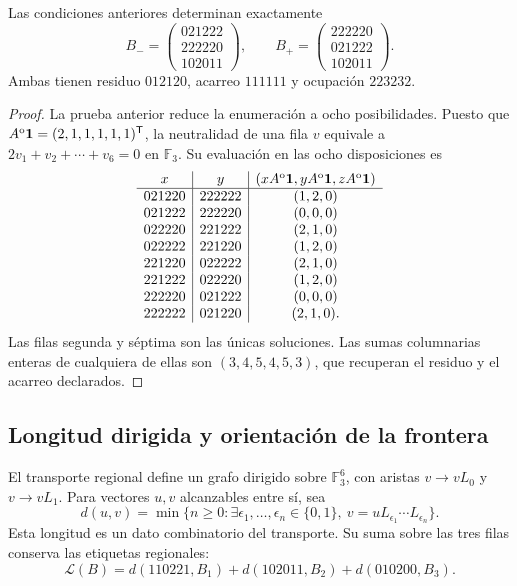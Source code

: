 \begin{theorem}
\label{r36c:thm:dos}
Las condiciones anteriores determinan exactamente
\[
B_- =\begin{pmatrix}021222\\222220\\102011\end{pmatrix},
\qquad
B_+ =\begin{pmatrix}222220\\021222\\102011\end{pmatrix}.
\]
Ambas tienen residuo $012120$, acarreo $111111$ y ocupación $223232$.
\end{theorem}
\begin{proof}
La prueba anterior reduce la enumeración a ocho posibilidades. Puesto que
$A^{\rm o}\mathbf1=(2,1,1,1,1,1)^{\mathsf T}$, la neutralidad de una
fila $v$ equivale a $2v_1+v_2+\cdots+v_6=0$ en $\mathbb F_3$.
Su evaluación en las ocho disposiciones es
\[
\begin{array}{c|c|c}
x&y&(xA^{\rm o}\mathbf1,yA^{\rm o}\mathbf1,zA^{\rm o}\mathbf1)\\\hline
021220&222222&(1,2,0)\\
021222&222220&(0,0,0)\\
022220&221222&(2,1,0)\\
022222&221220&(1,2,0)\\
221220&022222&(2,1,0)\\
221222&022220&(1,2,0)\\
222220&021222&(0,0,0)\\
222222&021220&(2,1,0).
\end{array}
\]
Las filas segunda y séptima son las únicas soluciones. Las sumas
columnarias enteras de cualquiera de ellas son $(3,4,5,4,5,3)$, que
recuperan el residuo y el acarreo declarados.
\end{proof}

\subsection{Longitud dirigida y orientación de la frontera}

El transporte regional define un grafo dirigido sobre $\mathbb F_3^6$,
con aristas $v\to vL_0$ y $v\to vL_1$. Para vectores $u,v$ alcanzables
entre sí, sea
\[
d(u,v)=\min\{n\ge0:\exists\epsilon_1,\ldots,\epsilon_n\in\{0,1\},
\ v=uL_{\epsilon_1}\cdots L_{\epsilon_n}\}.
\]
Esta longitud es un dato combinatorio del transporte. Su suma sobre las
tres filas conserva las etiquetas regionales:
\[
\mathcal L(B)=d(110221,B_1)+d(102011,B_2)+d(010200,B_3).
\]

